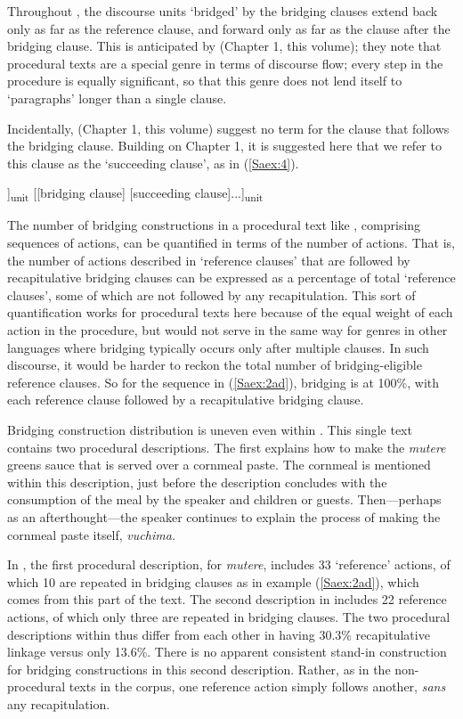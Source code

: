\documentclass[output=paper]{LSP/langsci}
\begin{document}
Throughout \citet{Chesi2014}, the discourse units `bridged' by the bridging clauses extend back only as far as the reference clause, and forward only as far as the clause after the bridging clause. This is anticipated by \citeauthor{guerin18} (Chapter 1, this volume); they note that procedural texts are a special genre in terms of discourse flow; every step in the procedure is equally significant, so that this genre does not lend itself to `paragraphs' longer than a single clause. 

Incidentally, \citeauthor{guerin18} (Chapter 1, this volume) suggest no term for the clause that follows the bridging clause. Building on Chapter 1, it is suggested here that we refer to this clause as the `succeeding clause', as in (\ref{Saex:4}).

\begin{exe}
	\ex	\label{Saex:4}
		\glt	[... [reference clause]]\textsubscript{unit} [[bridging clause] [succeeding clause]...]\textsubscript{unit}
\end{exe}

The number of bridging constructions in a procedural text like \citet{Chesi2014}, comprising sequences of actions, can be quantified in terms of the number of actions. That is, the number of actions described in `reference clauses' that are followed by recapitulative bridging clauses can be expressed as a percentage of total `reference clauses', some of which are not followed by any recapitulation. This sort of quantification works for procedural texts here because of the equal weight of each action in the procedure, but would not serve in the same way for genres in other languages where bridging typically occurs only after multiple clauses. In such discourse, it would be harder to reckon the total number of bridging-eligible reference clauses. So for the sequence in (\ref{Saex:2ad}), bridging is at 100\%, with each reference clause followed by a recapitulative bridging clause.

Bridging construction distribution is uneven even within \citet{Chesi2014}. This single text contains two procedural descriptions. The first explains how to make the \textit{mutere} greens sauce that is served over a cornmeal paste. The cornmeal is mentioned within this description, just before the description concludes with the consumption of the meal by the speaker and children or guests. Then—perhaps as an afterthought—the speaker continues to explain the process of making the cornmeal paste itself, \textit{vuchima.} 

In \citet{Chesi2014}, the first procedural description, for \textit{mutere}, includes 33 `reference' actions, of which 10 are repeated in bridging clauses as in example (\ref{Saex:2ad}), which comes from this part of the text. The second description in \citet{Chesi2014} includes 22 reference actions, of which only three are repeated in bridging clauses. The two procedural descriptions within \citet{Chesi2014} thus differ from each other in having 30.3\% recapitulative linkage versus only 13.6\%. There is no apparent consistent stand-in construction for bridging constructions in this second description. Rather, as in the non-procedural texts in the corpus, one reference action simply follows another, \textit{sans} any recapitulation.
\end{document}
